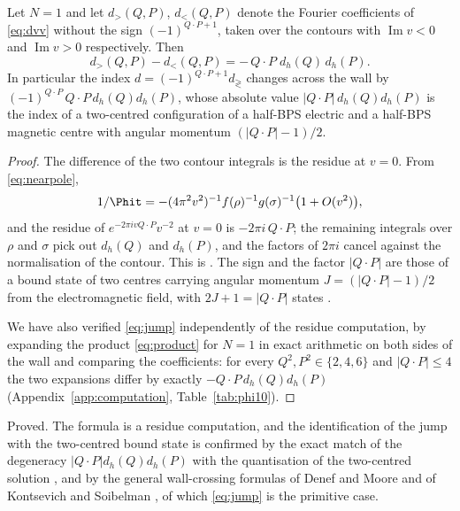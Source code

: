 \begin{theorem}\label{thm:wallcrossing}
Let $N=1$ and let $d_{>}(Q,P)$, $d_{<}(Q,P)$ denote the Fourier coefficients of \eqref{eq:dvv} without the sign $(-1)^{Q\cdot P+1}$, taken over the contours with $\operatorname{Im}v<0$ and $\operatorname{Im}v>0$ respectively. Then
\begin{equation}\label{eq:jump}
d_{>}(Q,P) - d_{<}(Q,P) = -\,Q\cdot P\; d_h(Q)\, d_h(P).
\end{equation}
In particular the index $d = (-1)^{Q\cdot P+1}d_{\gtrless}$ changes across the wall by $(-1)^{Q\cdot P}\,Q\cdot P\,d_h(Q)d_h(P)$, whose absolute value $|Q\cdot P|\,d_h(Q)d_h(P)$ is the index of a two-centred configuration of a half-BPS electric and a half-BPS magnetic centre with angular momentum $(|Q\cdot P|-1)/2$.
\end{theorem}

\begin{proof}
The difference of the two contour integrals is the residue at $v=0$. From \eqref{eq:nearpole},
\[
1/\Phit = -(4\pi^2v^2)^{-1}f(\rho)^{-1}g(\sigma)^{-1}\bigl(1+O(v^2)\bigr),
\]
and the residue of $e^{-2\pi i v Q\cdot P}v^{-2}$ at $v=0$ is $-2\pi i\,Q\cdot P$; the remaining integrals over $\rho$ and $\sigma$ pick out $d_h(Q)$ and $d_h(P)$, and the factors of $2\pi i$ cancel against the normalisation of the contour. This is \cite[eq.~(2.13)]{Sen07twocentred}. The sign and the factor $|Q\cdot P|$ are those of a bound state of two centres carrying angular momentum $J = (|Q\cdot P|-1)/2$ from the electromagnetic field, with $2J+1 = |Q\cdot P|$ states \cite{Sen07twocentred,DenefMoore11}.

We have also verified \eqref{eq:jump} independently of the residue computation, by expanding the product \eqref{eq:product} for $N=1$ in exact arithmetic on both sides of the wall and comparing the coefficients: for every $Q^2,P^2\in\{2,4,6\}$ and $|Q\cdot P|\le 4$ the two expansions differ by exactly $-Q\cdot P\,d_h(Q)d_h(P)$ (Appendix~\ref{app:computation}, Table~\ref{tab:phi10}).
\end{proof}

\begin{verdict}[claim 7]
Proved. The formula is a residue computation, and the identification of the jump with the two-centred bound state is confirmed by the exact match of the degeneracy $|Q\cdot P|d_h(Q)d_h(P)$ with the quantisation of the two-centred solution \cite{Sen07twocentred}, and by the general wall-crossing formulas of Denef and Moore \cite{DenefMoore11} and of Kontsevich and Soibelman \cite{KS11}, of which \eqref{eq:jump} is the primitive case.
\end{verdict}


